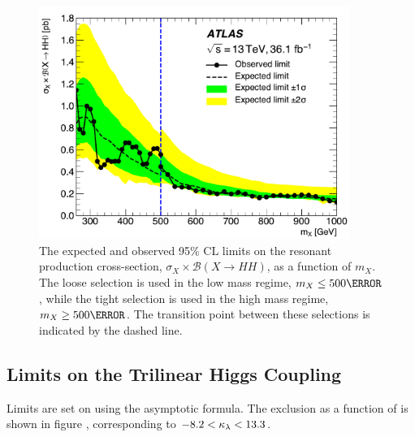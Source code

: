 \begin{figure}[htbp]
  \centering
\includegraphics[width=0.9\textwidth]{chapters/chapter5_yybb/images/limits/resonant.pdf}
\caption[The expected and observed limits on the resonant \HH production cross section as a function of $m_{X}$.]
{The expected and observed 95\% \gls{CL} limits on the resonant \HH production cross-section, $\sigma_{X} \times \mathcal{B}(X\rightarrow HH)$, as a function of $m_{X}$. The loose selection is used in the low mass regime, $m_{X} \leq \unit{500}{\GeV}$, while the tight selection is used in the high mass regime, $m_{X} \geq \unit{500}{\GeV}$. The transition point between these selections is indicated by the dashed line.} 
\label{fig:limits-resonant}
\end{figure}

\subsection{Limits on the Trilinear Higgs Coupling}

Limits are set on \klambda using the asymptotic formula. The exclusion as a function of \klambda is shown in figure , corresponding to $-8.2 < \kappa_{\lambda} < 13.3$.

